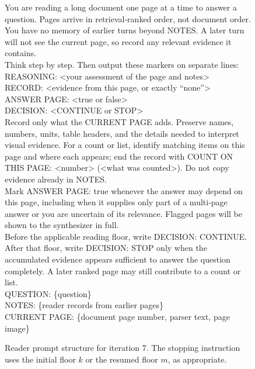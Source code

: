 \begin{figure}[h]
\centering
\begin{tcolorbox}[
  colback=gray!5,colframe=gray!50,boxrule=0.4pt,
  fontupper=\small\ttfamily,left=6pt,right=6pt
]
You are reading a long document one page at a time to answer a question.
Pages arrive in retrieval-ranked order, not document order. You have no
memory of earlier turns beyond NOTES. A later turn will not see the current
page, so record any relevant evidence it contains.\\[0.5em]

Think step by step. Then output these markers on separate lines:\\
REASONING: <your assessment of the page and notes>\\
RECORD: <evidence from this page, or exactly ``none''>\\
ANSWER PAGE: <true or false>\\
DECISION: <CONTINUE or STOP>\\[0.5em]

Record only what the CURRENT PAGE adds. Preserve names, numbers, units,
table headers, and the details needed to interpret visual evidence. For a
count or list, identify matching items on this page and where each appears;
end the record with COUNT ON THIS PAGE: <number> (<what was counted>).
Do not copy evidence already in NOTES.\\[0.5em]

Mark ANSWER PAGE: true whenever the answer may depend on this page,
including when it supplies only part of a multi-page answer or you are
uncertain of its relevance. Flagged pages will be shown to the synthesizer
in full.\\[0.5em]

Before the applicable reading floor, write DECISION: CONTINUE. After that
floor, write DECISION: STOP only when the accumulated evidence appears
sufficient to answer the question completely. A later ranked page may
still contribute to a count or list.\\[0.5em]

QUESTION: \{question\}\\
NOTES: \{reader records from earlier pages\}\\
CURRENT PAGE: \{document page number, parser text, page image\}
\end{tcolorbox}
\caption{Reader prompt structure for iteration 7. The stopping instruction uses the initial floor $k$ or the resumed floor $m$, as appropriate.}
\label{fig:app_reader_prompt}
\end{figure}